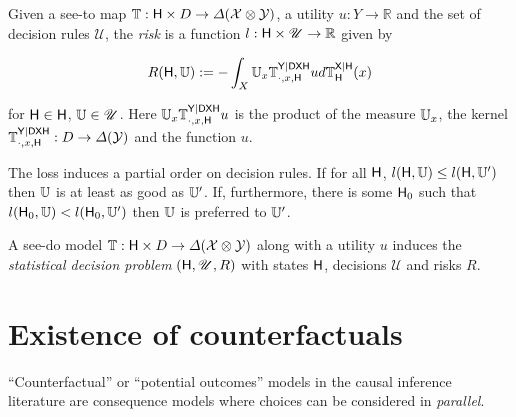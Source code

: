 \begin{definition}[Risk]
Given a see-to map $\mathbb{T}:\mathsf{H}\times D\to \Delta(\mathcal{X}\otimes\mathcal{Y})$, a utility $u:Y\to \mathbb{R}$ and the set of decision rules $\mathscr{U}$, the \emph{risk} is a function $l:\mathsf{H}\times \mathscr{U}\to \mathbb{R}$ given by

\begin{align}
    R(\mathsf{H},\mathbb{U}) := - \int_X  \mathbb{U}_x \mathbb{T}^{\mathsf{Y}|\mathsf{D}\mathsf{X}\mathsf{H}}_{\cdot,x,\mathsf{H}} u d\mathbb{T}^{\mathsf{X}|\mathsf{H}}_{\mathsf{H}}(x)
\end{align}

for $\mathsf{H}\in \mathsf{H}$, $\mathbb{U}\in \mathscr{U}$. Here $\mathbb{U}_x \mathbb{T}^{\mathsf{Y}|\mathsf{D}\mathsf{X}\mathsf{H}}_{\cdot,x,\mathsf{H}} u$ is the product of the measure $\mathbb{U}_x$, the kernel $\mathbb{T}^{\mathsf{Y}|\mathsf{D}\mathsf{X}\mathsf{H}}_{\cdot,x,\mathsf{H}}:D\to \Delta(\mathcal{Y})$ and the function $u$.
\end{definition}

The loss induces a partial order on decision rules. If for all $\mathsf{H}$, $l(\mathsf{H},\mathbb{U})\leq l(\mathsf{H},\mathbb{U}')$ then $\mathbb{U}$ is at least as good as $\mathbb{U}'$. If, furthermore, there is some $\mathsf{H}_0$ such that $l(\mathsf{H}_0,\mathbb{U})<l(\mathsf{H}_0,\mathbb{U}')$ then $\mathbb{U}$ is preferred to $\mathbb{U}'$.

\begin{definition}
A see-do model $\mathbb{T}:\mathsf{H}\times D\to \Delta(\mathcal{X}\otimes\mathcal{Y})$ along with a utility $u$ induces the \emph{statistical decision problem} $(\mathsf{H},\mathscr{U},R)$ with states $\mathsf{H}$, decisions $\mathscr{U}$ and risks $R$.


\end{definition}


\section{Existence of counterfactuals}


``Counterfactual'' or ``potential outcomes'' models in the causal inference literature are consequence models where choices can be considered in \emph{parallel}. 

